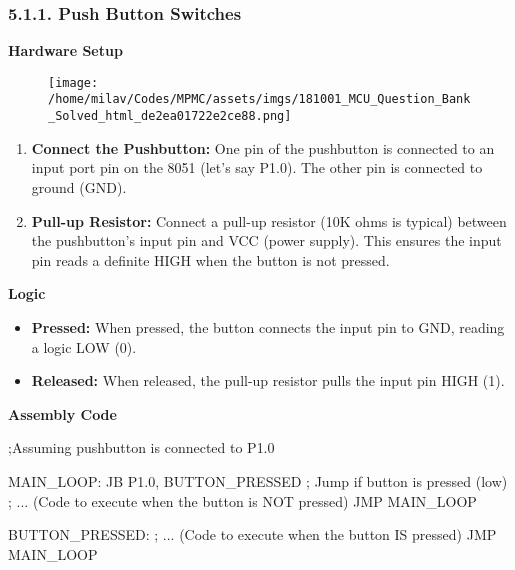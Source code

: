 \documentclass[
]{article}
\newenvironment{Shaded}{}{}
\newcommand{\NormalTok}[1]{#1}
\begin{document}
\hypertarget{511-push-button-switches}{%
\subsubsection{5.1.1. Push Button
Switches}\label{511-push-button-switches}}

\textbf{Hardware Setup}

\begin{figure}
\centering
\texttt{[image: /home/milav/Codes/MPMC/assets/imgs/181001\_MCU\_Question\_Bank\_Solved\_html\_de2ea01722e2ce88.png]}
\caption{}
\end{figure}

\begin{enumerate}
\def\labelenumi{\arabic{enumi}.}
\item
  \textbf{Connect the Pushbutton:} One pin of the pushbutton is
  connected to an input port pin on the 8051 (let's say P1.0). The other
  pin is connected to ground (GND).
\item
  \textbf{Pull-up Resistor:} Connect a pull-up resistor (10K ohms is
  typical) between the pushbutton's input pin and VCC (power supply).
  This ensures the input pin reads a definite HIGH when the button is
  not pressed.
\end{enumerate}

\textbf{Logic}

\begin{itemize}
\item
  \textbf{Pressed:} When pressed, the button connects the input pin to
  GND, reading a logic LOW (0).
\item
  \textbf{Released:} When released, the pull-up resistor pulls the input
  pin HIGH (1).
\end{itemize}

\textbf{Assembly Code}

\begin{Shaded}
\begin{Highlighting}[]
\NormalTok{;Assuming pushbutton is connected to P1.0}

\NormalTok{MAIN\_LOOP:}
\NormalTok{    JB P1.0, BUTTON\_PRESSED   ; Jump if button is pressed (low)}
\NormalTok{    ; ... (Code to execute when the button is NOT pressed)}
\NormalTok{    JMP MAIN\_LOOP}

\NormalTok{BUTTON\_PRESSED:}
\NormalTok{    ; ... (Code to execute when the button IS pressed)}
\NormalTok{    JMP MAIN\_LOOP}
\end{Highlighting}
\end{Shaded}
\end{document}
